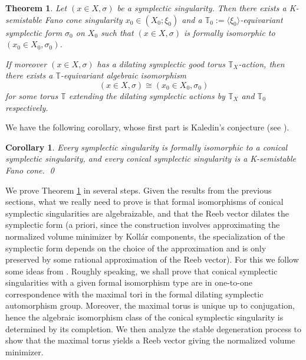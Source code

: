 \documentclass[12pt]{amsart}
\newtheorem{thm}[prop]{Theorem}
\newtheorem{cor}[prop]{Corollary}
\theoremstyle{definition}
\newcommand{\bT}{\mathbb{T}}
\numberwithin{equation}{section}
\begin{document}
\begin{thm} \label{thm:Kaledin enhanced}
Let $(x\in X,\sigma)$ be a symplectic singularity. Then there exists a K-semistable Fano cone singularity $x_0\in (X_0;\xi_0)$ and a $\bT_0:=\langle\xi_0\rangle$-equivariant symplectic form $\sigma_0$ on $X_0$ such that $(x\in X,\sigma)$ is formally isomorphic to $(x_0\in X_0,\sigma_0)$. 

If moreover $(x\in X,\sigma)$ has a dilating symplectic good torus $\bT_X$-action, then there exists a $\bT$-equivariant algebraic isomorphism 
\[
(x\in X,\sigma)\cong (x_0\in X_0,\sigma_0)
\]
for some torus $\bT$ extending the dilating symplectic actions by $\bT_X$ and $\bT_0$ respectively.
\end{thm}
We have the following corollary, whose first part is Kaledin's conjecture (see \cite{Kaledin-sym, Kaledin-survey}). 
\begin{cor} \label{cor-Kaledin}
Every symplectic singularity is formally isomorphic to a conical symplectic singularity, and every conical symplectic singularity is a K-semistable Fano cone. \qed
\end{cor}


We prove Theorem \ref{thm:Kaledin enhanced} in several steps. Given the results from the previous sections, what we really need to prove is that formal isomorphisms of conical symplectic singularities are algebraizable, and that the Reeb vector dilates the symplectic form (a priori, since the construction involves approximating the normalized volume minimizer by Koll\'ar components, the specialization of the symplectic form depends on the choice of the approximation and is only preserved by some rational approximation of the Reeb vector). For this we follow some ideas from \cite[8.4]{Kol-cone-auto}. Roughly speaking, we shall prove that conical symplectic singularities with a given formal isomorphism type are in one-to-one correspondence with the maximal tori in the formal dilating symplectic automorphism group. Moreover, the maximal torus is unique up to conjugation, hence the algebraic isomorphism class of the conical symplectic singularity is determined by its completion. We then analyze the stable degeneration process to show that the maximal torus yields a Reeb vector giving the normalized volume minimizer.
\end{document}
